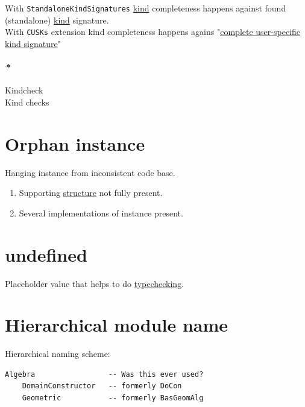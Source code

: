 \documentclass[a4paper,14pt,oneside]{book}
\begin{document}
{With \texttt{StandaloneKindSignatures} \hyperref[org3e1a79e]{kind} completeness happens against found (standalone) \hyperref[org3e1a79e]{kind} signature.\\

With \texttt{CUSKs} extension \label{orgd7c3975}kind completeness happens agains "\hyperref[org6e6932e]{complete user-specific kind signature}"\\

\paragraph{\emph{*}}
\label{sec:org94cd297}

\label{org80a192f}Kindcheck\\
\label{org94e1638}Kind checks\\

\section{\label{org94f4856}Orphan instance}
\label{sec:orgf6e921f}
Hanging instance from inconsistent code base.\\
\begin{enumerate}
\item Supporting \hyperref[org080800e]{structure} not fully present.\\
\item Several implementations of instance present.\\
\end{enumerate}

\section{\label{org7cb8fc1}undefined}
\label{sec:org710e3dc}
Placeholder value that helps to do \hyperref[orgffb2d89]{typechecking}.\\

\section{\label{org75004c8}Hierarchical module name}
\label{sec:orgc5f567b}
Hierarchical naming scheme:\\

\begin{verbatim}
Algebra                 -- Was this ever used?
    DomainConstructor   -- formerly DoCon
    Geometric           -- formerly BasGeomAlg


\end{verbatim}}
\end{document}
